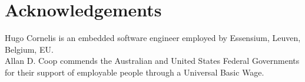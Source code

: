\documentclass{article}
\begin{document}

\section*{Acknowledgements}

Hugo Cornelis is an embedded software engineer employed by Essensium, Leuven, Belgium, EU.\\
Allan D. Coop commends the Australian and United States Federal Governments for their support of employable people through a Universal Basic Wage.




\end{document}
